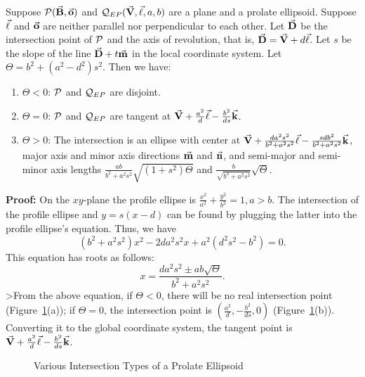 \begin{theorem}
\label{thm:prolate}
     Suppose ${\cal P}(\vec{\bf B},\vec{\bf o})$ and
${\cal Q}_{EP}(\vec{\bf V},\vec{\bf \ell},a,b)$ are a plane and a prolate 
ellipsoid.  Suppose $\vec{\bf \ell}$ and $\vec{\bf o}$ are neither parallel nor 
perpendicular to each other.  Let $\vec{\bf D}$ be the intersection point of 
${\cal P}$ and the axis of revolution, that is,
$\vec{\bf D}=\vec{\bf V}+d\vec{\bf \ell}$.  Let $s$ be the slope of the
line $\vec{\bf D}+t\vec{\bf m}$ in the local coordinate system.
Let $\Theta=b^2+(a^2-d^2)s^2$.  Then we have:
\begin{enumerate}
     \item $\Theta<0$: ${\cal P}$ and ${\cal Q}_{EP}$ are disjoint.
     \item $\Theta=0$: ${\cal P}$ and ${\cal Q}_{EP}$ are tangent at
          $\vec{\bf V}+\frac{a^2}{d}\vec{\bf \ell}-\frac{b^2}{ds}\vec{\bf k}$.
     \item $\Theta>0$: The intersection is an ellipse with center at
          $\vec{\bf V}+\frac{da^2s^2}{b^2+a^2s^2}\vec{\bf \ell}
               -\frac{sdb^2}{b^2+a^2s^2}\vec{\bf k}$, major axis and minor axis
          directions $\vec{\bf m}$ and $\vec{\bf n}$, and semi-major and semi-minor
          axis lengths $\frac{ab}{b^2+a^2s^2}\sqrt{(1+s^2)\Theta}$ and
          $\frac{b}{\sqrt{b^2+a^2s^2}}\sqrt{\Theta}$.
\end{enumerate}
\end{theorem}
{\bf Proof:}  On the $xy$-plane the profile ellipse is 
$\frac{x^2}{a^2}+\frac{y^2}{b^2}=1, a>b$.  The intersection of the profile
ellipse and $y=s(x-d)$ can be found by plugging the latter into the profile
ellipse's equation.  Thus, we have
\begin{equation}
\label{eqn:pro-2degree}
     (b^2+a^2s^2)x^2-2da^2s^2x+a^2(d^2s^2-b^2)=0.
\end{equation}
This equation has roots as follows:
\[ x=\frac{da^2s^2\pm ab\sqrt{\Theta}}{b^2+a^2s^2}. \]
>From the above equation, if $\Theta<0$, there will be no real intersection 
point (Figure~\ref{fig:EP}(a)); if $\Theta=0$, the 
intersection point is $\left(\frac{a^2}{d},-\frac{b^2}{ds},0\right)$
(Figure~\ref{fig:EP}(b)).  Converting it to the global coordinate system, the 
tangent point is $\vec{\bf V}+\frac{a^2}{d}\vec{\bf \ell}-\frac{b^2}{ds}\vec{\bf k}$.
\begin{figure}
\vspace{5cm}
\caption{Various Intersection Types of a Prolate Ellipsoid}
\label{fig:EP}
\end{figure}

